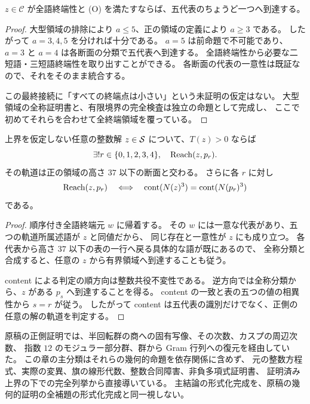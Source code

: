 \begin{theorem}[順序付き全語終端元の分類]
\label{bp:pos-terminal-classification}
\leanok
$z\in\mathcal C$ が全語終端性と (O) を満たすならば、五代表のちょうど一つへ到達する。
\end{theorem}

\begin{proof}
\leanok
大型領域の排除により $a\leq5$、正の領域の定義により $a\geq3$ である。
したがって $a=3,4,5$ を分ければ十分である。
$a=5$ は前命題で不可能であり、$a=3$ と $a=4$ は各断面の分類で五代表へ到達する。
全語終端性から必要な二短語・三短語終端性を取り出すことができる。
各断面の代表の一意性は既証なので、それをそのまま統合する。

この最終接続に「すべての終端点は小さい」という未証明の仮定はない。
大型領域の全称証明書と、有限境界の完全検査は独立の命題として完成し、
ここで初めてそれらを合わせて全終端領域を覆っている。
\end{proof}

\begin{theorem}[正側の全変異軌道分類と直接判定]
\label{bp:pos-classification}
\leanok
上界を仮定しない任意の整数解 $z\in\mathcal S$ について、$T(z)>0$ ならば
\[
 \exists! r\in\{0,1,2,3,4\},\quad\operatorname{Reach}(z,p_r).
\]
その軌道は正の領域の高さ $37$ 以下の断面と交わる。
さらに各 $r$ に対し
\[
 \operatorname{Reach}(z,p_r)\quad\Longleftrightarrow\quad
 \operatorname{cont}(N(z)^3)=\operatorname{cont}(N(p_r)^3)
\]
である。
\end{theorem}

\begin{proof}
\leanok
順序付き全語終端元 $w$ に帰着する。
その $w$ には一意な代表があり、五つの軌道所属述語が $z$ と同値だから、
同じ存在と一意性が $z$ にも成り立つ。
各代表から高さ $37$ 以下の表の一行へ戻る具体的な語が既にあるので、
全称分類と合成すると、任意の $z$ から有界領域へ到達することも従う。

content による判定の順方向は整数共役不変性である。
逆方向では全称分類から、$z$ がある $p_s$ へ到達することを得る。
content の一致と表の五つの値の相異性から $s=r$ が従う。
したがって content は五代表の識別だけでなく、正側の任意の解の軌道を判定する。
\end{proof}

原稿の正側証明では、半回転群の商への固有写像、その次数、カスプの周辺次数、
指数 $12$ のモジュラー部分群、群から Gram 行列への復元を経由していた。
この章の主分類はそれらの幾何的命題を依存関係に含めず、
元の整数方程式、実際の変異、旗の線形代数、整数合同障害、非負多項式証明書、
証明済み上界の下での完全列挙から直接導いている。
主結論の形式化完成を、原稿の幾何的証明の全補題の形式化完成と同一視しない。
